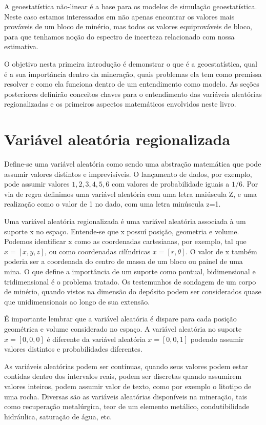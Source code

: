 A geoestatística não-linear é a base para os modelos de simulação geoestatística. Neste caso estamos interessados em não apenas encontrar os valores mais prováveis de um bloco de minério, mas todos os valores equiprováveis de bloco, para que tenhamos noção do espectro de incerteza relacionado com nossa estimativa.   

O objetivo nesta primeira introdução é demonstrar o que é a geoestatística, qual é a sua importância dentro da mineração, quais problemas ela tem como premissa resolver e como ela funciona dentro de um entendimento como modelo. As seções posteriores definirão conceitos chaves para o entendimento das variáveis aleatórias regionalizadas e os primeiros aspectos matemáticos envolvidos neste livro.  


\section{Variável aleatória regionalizada}

Define-se uma variável aleatória como sendo uma abstração matemática que pode assumir valores distintos e imprevisíveis. O lançamento de dados, por exemplo, pode assumir valores ${1,2,3,4,5,6}$ com valores de probabilidade iguais a $1/6$. Por via de regra definimos uma variável aleatória com uma letra maiúscula Z, e uma realização como o valor de 1 no dado, com uma letra minúscula z=1. 

Uma variável aleatória regionalizada é uma variável aleatória associada à um suporte x no espaço. Entende-se que x possuí posição, geometria e volume. Podemos identificar x como as coordenadas cartesianas, por exemplo, tal que $x=[x,y,z]$, ou como coordenadas cilíndricas $x=[r,\theta]$. O valor de x também poderia ser a coordenada do centro de massa de um bloco ou painel de uma mina. O que define a importância de um suporte como pontual, bidimensional e tridimensional é o problema tratado. Os testemunhos de sondagem de um corpo de minério, quando vistos na dimensão do depósito podem ser considerados quase que unidimensionais ao longo de sua extensão. 

É importante lembrar que a variável aleatória é dispare para cada posição geométrica e volume considerado no espaço. A variável aleatória no suporte $x=[0,0,0]$ é diferente da variável aleatória $x=[0,0,1]$ podendo assumir valores distintos e probabilidades diferentes.

As variáveis aleatórias podem ser contínuas, quando seus valores podem estar contidas dentro dos intervalos reais, podem ser discretas quando assumirem valores inteiros, podem assumir valor de texto, como por exemplo o litotipo de uma rocha. Diversas são as variáveis aleatórias disponíveis na mineração, tais como recuperação metalúrgica, teor de um elemento metálico, condutibilidade hidráulica, saturação de água, etc. 

